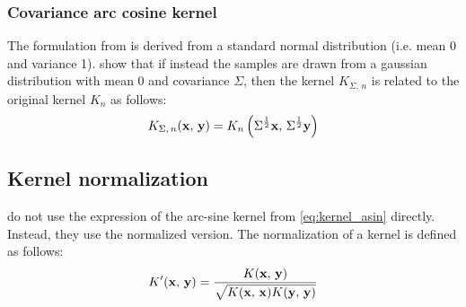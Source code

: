 \subsubsection{Covariance arc cosine kernel}

The formulation from \textcite{choLargemarginClassificationInfinite2010} is derived from a standard normal
distribution (i.e. mean 0 and variance 1).
\Textcite{pandeyGoDeepWide2014} show that if instead the samples are drawn from a gaussian
distribution with mean 0 and covariance $\Sigma$, then the kernel $K_{\Sigma,\,n}$ is related to the
original kernel $K_{n}$ as follows:
\begin{equation}\label{eq:kernel_pandey}
K_{\Sigma,\,n}(\mathbf{x},\,\mathbf{y}) = K_{n}\left(\Sigma^{\frac{1}{2}}\mathbf{x},\,\Sigma^{\frac{1}{2}}\mathbf{y}\right)
\end{equation}

\subsection{Kernel normalization}%

\Textcite{frenayParameterinsensitiveKernelExtreme2011} do not use the expression
of the arc-sine kernel from \cref{eq:kernel_asin} directly. Instead, they use
the normalized version. The normalization of a kernel is defined as follows:
\begin{equation}\label{eq:kernel_normalization}
    K'(\mathbf{x},\,\mathbf{y}) = \frac{K(\mathbf{x},\,\mathbf{y})}{\sqrt{K(\mathbf{x},\,\mathbf{x})K(\mathbf{y},\,\mathbf{y})}}
\end{equation}




